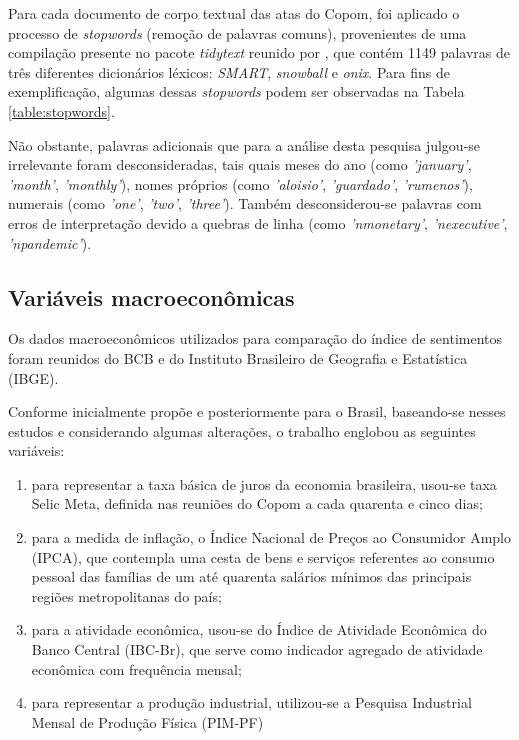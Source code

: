 Para cada documento de corpo textual das atas do Copom, foi aplicado o processo de \textit{stopwords} (remoção de palavras comuns), provenientes de uma compilação presente no pacote \textit{tidytext} reunido por , que contém 1149 palavras de três diferentes dicionários léxicos: \textit{SMART}, \textit{snowball} e \textit{onix}. Para fins de exemplificação, algumas dessas \textit{stopwords} podem ser observadas na Tabela \ref{table:stopwords}.

Não obstante, palavras adicionais que para a análise desta pesquisa julgou-se irrelevante foram desconsideradas, tais quais meses do ano (como \textit{'january'}, \textit{'month'}, \textit{'monthly'}), nomes próprios (como \textit{'aloisio'}, \textit{'guardado'}, \textit{'rumenos'}), numerais (como \textit{'one'}, \textit{'two'}, \textit{'three'}). Também desconsiderou-se palavras com erros de interpretação devido a quebras de linha (como \textit{'nmonetary'}, \textit{'nexecutive'}, \textit{'npandemic'}).

\subsection{Variáveis macroeconômicas}

Os dados macroeconômicos utilizados para comparação do índice de sentimentos foram reunidos do BCB e do Instituto Brasileiro de Geografia e Estatística (IBGE).

Conforme inicialmente propõe  e posteriormente  para o Brasil, baseando-se nesses estudos e considerando algumas alterações, o trabalho englobou as seguintes variáveis:

\begin{enumerate}[noitemsep,nosep,labelindent=\parindent,leftmargin=*,label={\alph*}) ] 
	\item para representar a taxa básica de juros da economia brasileira, usou-se taxa Selic Meta, definida nas reuniões do Copom a cada quarenta e cinco dias;
	\item para a medida de inflação, o Índice Nacional de Preços ao Consumidor Amplo (IPCA), que contempla uma cesta de bens e serviços referentes ao consumo pessoal das famílias de um até quarenta salários mínimos das principais regiões metropolitanas do país;
	\item para a atividade econômica, usou-se do Índice de Atividade Econômica do Banco Central (IBC-Br), que serve como indicador agregado de atividade econômica com frequência mensal;
	\item para representar a produção industrial, utilizou-se a Pesquisa Industrial Mensal de Produção Física (PIM-PF)
\end{enumerate}

